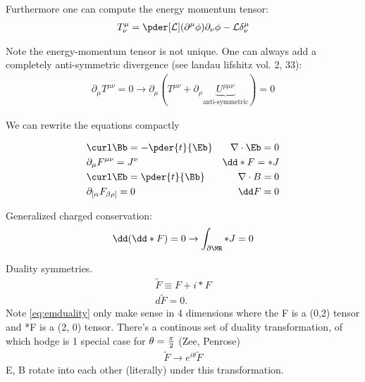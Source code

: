 \documentclass[10pt]{scrartcl}
\begin{document}
Furthermore one can compute the energy momentum tensor:
\begin{align}
	T^{\mu}_{\nu} = \pder[ \mathcal{L} ]{\left( \partial^\mu \phi \right)}  \partial_\nu \phi - \mathcal{L} \delta^{\mu}_{\nu}
\end{align}

Note the energy-momentum tensor is not unique.  One can always add a completely anti-symmetric divergence (see landau lifshitz vol. 2, 33):
\begin{align}
	\partial_{\mu} T^{\mu \nu} = 0 \rightarrow \partial_\mu \left(T^{\mu \nu} + \partial_{\rho} \underbrace{U^{\rho \mu \nu}}_{\text{anti-symmetric}} \right) = 0 
\end{align}

We can rewrite the equations compactly

\begin{align}
	& \curl \Bb =  - \pder{t}{\Eb} &   \nabla \cdot \Eb = 0 \\
	& \partial_\mu F^{\mu \nu} = J^\nu  &  \dd * F = * J  \\
	& \curl \Eb = \pder{t}{\Bb}  & \nabla \cdot B = 0  \\
	& \partial_{[\alpha} F_{\beta \rho ]} = 0  & \dd F = 0 
\end{align}

Generalized charged conservation:
\begin{align}
	\dd (\dd * F) = 0 \rightarrow \int_{\partial \MR} *J = 0
\end{align}

\begin{example}
	Duality symmetries.
	\begin{align}
		\tilde{F} \equiv F + i *F \label{eq:emduality} \\
		d \tilde{F} = 0.
	\end{align}
	Note \ref{eq:emduality} only make sense in 4 dimensions where the F is a (0,2) tensor and *F is a (2, 0) tensor.
	There's a continous set of duality transformation, of which hodge is 1 special case for $\theta = {\pi \over 2}$ (Zee, Penrose)
	\begin{align}
		\tilde{F} \rightarrow e^{i \theta} \tilde{F}
	\end{align}
	E, B rotate into each other (literally) under this transformation.
\end{example}
\end{document}
